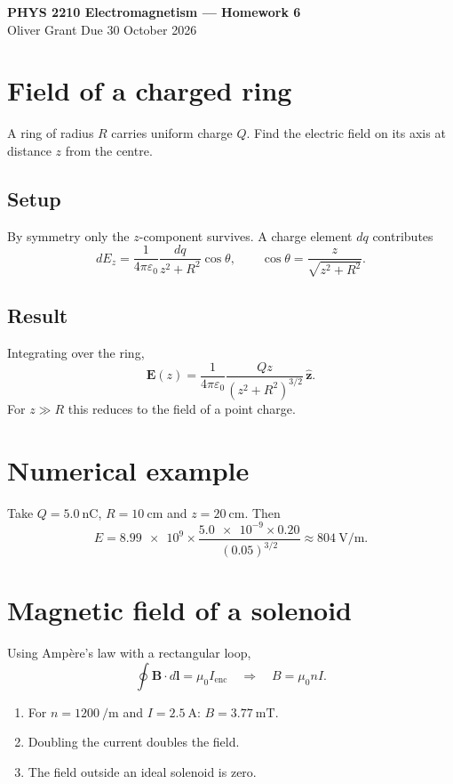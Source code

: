 \documentclass[11pt]{article}
\newcommand{\vect}[1]{\mathbf{#1}}
\begin{document}
\begin{center}
\textbf{\large PHYS 2210 Electromagnetism --- Homework 6}\\
Oliver Grant \quad\textbullet\quad Due 30 October 2026
\end{center}

\section{Field of a charged ring}
A ring of radius $R$ carries uniform charge $Q$. Find the electric field on its axis at
distance $z$ from the centre.

\subsection{Setup}
By symmetry only the $z$-component survives. A charge element $dq$ contributes
\[
dE_z = \frac{1}{4\pi\varepsilon_0}\frac{dq}{z^2+R^2}\cos\theta,
\qquad \cos\theta = \frac{z}{\sqrt{z^2+R^2}}.
\]

\subsection{Result}
Integrating over the ring,
\begin{equation}
\vect{E}(z) = \frac{1}{4\pi\varepsilon_0}\frac{Qz}{(z^2+R^2)^{3/2}}\,\hat{\vect{z}}.
\end{equation}
For $z\gg R$ this reduces to the field of a point charge.

\section{Numerical example}
Take $Q = \SI{5.0}{\nano\coulomb}$, $R = \SI{10}{\centi\metre}$ and
$z = \SI{20}{\centi\metre}$. Then
\[
E = \num{8.99e9} \times \frac{\num{5.0e-9}\times 0.20}{(0.05)^{3/2}}
  \approx \SI{804}{\volt\per\metre}.
\]

\section{Magnetic field of a solenoid}
Using Amp\`ere's law with a rectangular loop,
\[
\oint \vect{B}\cdot d\vect{l} = \mu_0 I_{\text{enc}}
\quad\Longrightarrow\quad B = \mu_0 n I.
\]
\begin{enumerate}[label=(\roman*)]
  \item For $n = \SI{1200}{\per\metre}$ and $I = \SI{2.5}{\ampere}$:
        $B = \SI{3.77}{\milli\tesla}$.
  \item Doubling the current doubles the field.
  \item The field outside an ideal solenoid is zero.
\end{enumerate}
\end{document}
